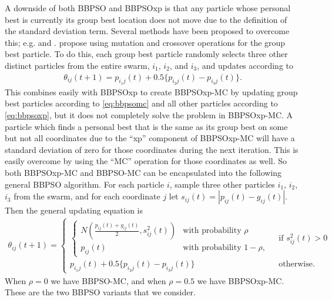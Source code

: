 \documentclass[12pt]{article}
\begin{document}
A downside of both BBPSO and BBPSOxp is that any particle whose personal best is currently its group best location does not move due to the definition of the standard deviation term. Several methods have been proposed to overcome this; e.g. \citet{hsieh2010modified} and \citet{zhang2011novel}. \citet{zhang2011novel} propose using mutation and crossover operations for the group best particle. To do this, each group best particle randomly selects three other distinct particles from the entire swarm, $i_1$, $i_2$, and $i_3$, and updates according to
\begin{align}\label{eq:bbpsomc}
\theta_{ij}(t+1) = p_{i_1j}(t) + 0.5\{p_{i_2j}(t) - p_{i_3j}(t)\}.
\end{align}
This combines easily with BBPSOxp to create BBPSOxp-MC by updating group best particles according to \eqref{eq:bbpsomc} and all other particles according to \eqref{eq:bbpsoxp}, but it does not completely solve the problem in BBPSOxp-MC. A particle which finds a personal best that is the same as its group best on some but not all coordinates due to the ``xp'' component of BBPSOxp-MC will have a standard deviation of zero for those coordinates during the next iteration. This is easily overcome by using the ``MC'' operation for those coordinates as well. So both BBPSOxp-MC and BBPSO-MC can be encapsulated into the following general BBPSO algorithm. For each particle $i$, sample three other particles $i_1$, $i_2$, $i_3$ from the swarm, and for each coordinate $j$ let $s_{ij}(t) = |p_{ij}(t) - g_{ij}(t)|$. Then the general updating equation is
\begin{align}\label{eq:bbpsoall}
\theta_{ij}(t+1) = 
  \begin{cases} 
    \begin{cases} N\left(\frac{p_{ij}(t) + g_{ij}(t)}{2}, s^2_{ij}(t)\right) & \mbox{with probability } \rho\\
      p_{ij}(t) & \mbox{with probability } 1 - \rho,
    \end{cases}
    & \mbox{ if } s^2_{ij}(t) > 0\\
    p_{i_1j}(t) + 0.5\{p_{i_2j}(t) - p_{i_3j}(t)\} & \mbox{ otherwise.}
  \end{cases}
\end{align}
When $\rho = 0$ we have BBPSO-MC, and when $\rho = 0.5$ we have BBPSOxp-MC. These are the two BBPSO variants that we consider.
\end{document}
